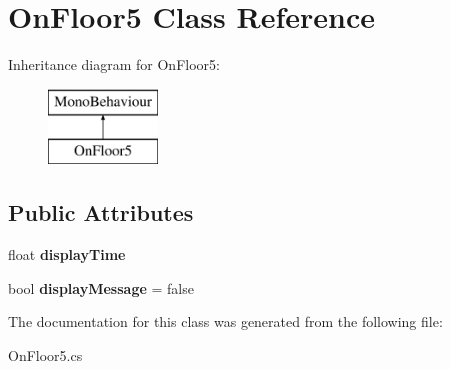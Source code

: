 \hypertarget{class_on_floor5}{}\section{On\+Floor5 Class Reference}
\label{class_on_floor5}
Inheritance diagram for On\+Floor5\+:\begin{figure}[H]
\begin{center}
\leavevmode
\includegraphics[height=2.000000cm]{class_on_floor5}
\end{center}
\end{figure}
\subsection*{Public Attributes}
\begin{DoxyCompactItemize}
\item 
\hypertarget{class_on_floor5_a9e6c5a8af8502f16a41500d4dd60ba01}{}\label{class_on_floor5_a9e6c5a8af8502f16a41500d4dd60ba01} 
float {\bfseries display\+Time}
\item 
\hypertarget{class_on_floor5_ad33d555a7c4f5db4aad2ef16dc565683}{}\label{class_on_floor5_ad33d555a7c4f5db4aad2ef16dc565683} 
bool {\bfseries display\+Message} = false
\end{DoxyCompactItemize}


The documentation for this class was generated from the following file\+:\begin{DoxyCompactItemize}
\item 
On\+Floor5.\+cs\end{DoxyCompactItemize}
